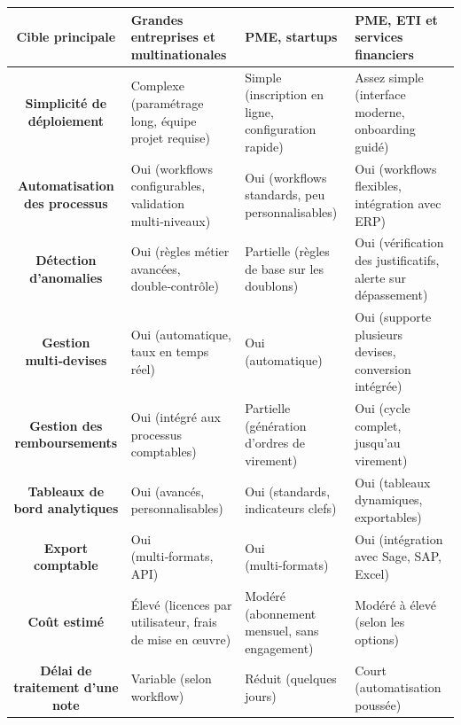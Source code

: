 \documentclass[12pt,a4paper]{report}
\begin{document}
\begin{longtable}{|c|p{3cm}|p{3cm}|p{3cm}|}
\hline

\textbf{Cible principale} & Grandes entreprises et multinationales & PME, startups & PME, ETI et services financiers \\

\hline

\textbf{Simplicité de déploiement} & Complexe (paramétrage long, équipe projet requise) & Simple (inscription en ligne, configuration rapide) & Assez simple (interface moderne, onboarding guidé) \\

\hline

\textbf{Automatisation des processus} & Oui (workflows configurables, validation multi‑niveaux) & Oui (workflows standards, peu personnalisables) & Oui (workflows flexibles, intégration avec ERP) \\

\hline

\textbf{Détection d’anomalies} & Oui (règles métier avancées, double‑contrôle) & Partielle (règles de base sur les doublons) & Oui (vérification des justificatifs, alerte sur dépassement) \\

\hline

\textbf{Gestion multi‑devises} & Oui (automatique, taux en temps réel) & Oui (automatique) & Oui (supporte plusieurs devises, conversion intégrée) \\

\hline

\textbf{Gestion des remboursements} & Oui (intégré aux processus comptables) & Partielle (génération d’ordres de virement) & Oui (cycle complet, jusqu’au virement) \\

\hline

\textbf{Tableaux de bord analytiques} & Oui (avancés, personnalisables) & Oui (standards, indicateurs clefs) & Oui (tableaux dynamiques, exportables) \\

\hline

\textbf{Export comptable} & Oui (multi‑formats, API) & Oui (multi‑formats) & Oui (intégration avec Sage, SAP, Excel) \\

\hline

\textbf{Coût estimé} & Élevé (licences par utilisateur, frais de mise en œuvre) & Modéré (abonnement mensuel, sans engagement) & Modéré à élevé (selon les options) \\

\hline

\textbf{Délai de traitement d’une note} & Variable (selon workflow) & Réduit (quelques jours) & Court (automatisation poussée) \\

\hline

\end{longtable}
\end{document}
